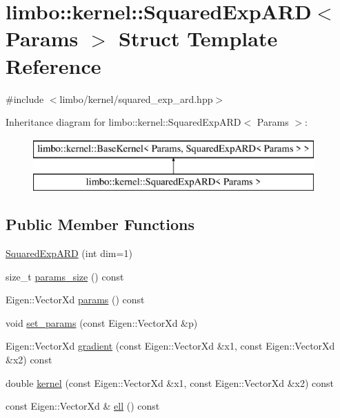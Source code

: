 \hypertarget{structlimbo_1_1kernel_1_1_squared_exp_a_r_d}{}\section{limbo\+:\+:kernel\+:\+:Squared\+Exp\+A\+RD$<$ Params $>$ Struct Template Reference}
\label{structlimbo_1_1kernel_1_1_squared_exp_a_r_d}


{\ttfamily \#include $<$limbo/kernel/squared\+\_\+exp\+\_\+ard.\+hpp$>$}

Inheritance diagram for limbo\+:\+:kernel\+:\+:Squared\+Exp\+A\+RD$<$ Params $>$\+:\begin{figure}[H]
\begin{center}
\leavevmode
\includegraphics[height=2.000000cm]{structlimbo_1_1kernel_1_1_squared_exp_a_r_d}
\end{center}
\end{figure}
\subsection*{Public Member Functions}
\begin{DoxyCompactItemize}
\item 
\hyperlink{structlimbo_1_1kernel_1_1_squared_exp_a_r_d_a33d5c074a487792a305a0ae89e864f34}{Squared\+Exp\+A\+RD} (int dim=1)
\item 
size\+\_\+t \hyperlink{structlimbo_1_1kernel_1_1_squared_exp_a_r_d_a42d4f438fd7902fddd4873ed16a2da60}{params\+\_\+size} () const 
\item 
Eigen\+::\+Vector\+Xd \hyperlink{structlimbo_1_1kernel_1_1_squared_exp_a_r_d_ace1e53f432d5e2446d34b5fb4df8f4f9}{params} () const 
\item 
void \hyperlink{structlimbo_1_1kernel_1_1_squared_exp_a_r_d_a91ed1b24f3399296ea414c71e8e59f3f}{set\+\_\+params} (const Eigen\+::\+Vector\+Xd \&p)
\item 
Eigen\+::\+Vector\+Xd \hyperlink{structlimbo_1_1kernel_1_1_squared_exp_a_r_d_aef88458f56aedf047a93d9196149a3b0}{gradient} (const Eigen\+::\+Vector\+Xd \&x1, const Eigen\+::\+Vector\+Xd \&x2) const 
\item 
double \hyperlink{structlimbo_1_1kernel_1_1_squared_exp_a_r_d_aa29a76c0fd6e79d2437f001076a18228}{kernel} (const Eigen\+::\+Vector\+Xd \&x1, const Eigen\+::\+Vector\+Xd \&x2) const 
\item 
const Eigen\+::\+Vector\+Xd \& \hyperlink{structlimbo_1_1kernel_1_1_squared_exp_a_r_d_aad6902b522c4fdd9b5c5799a0c440c40}{ell} () const 
\end{DoxyCompactItemize}


